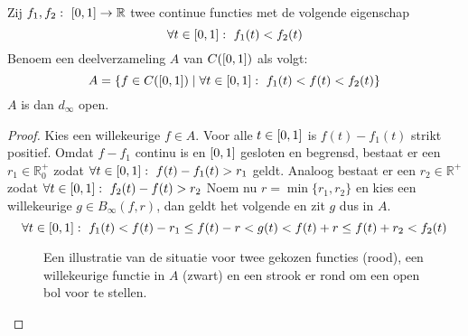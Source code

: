 \documentclass[main.tex]{subfiles}
\begin{document}
\begin{vb}
  Zij $f_{1},f_{2}:\ \interval{0}{1} \rightarrow \mathbb{R}$ twee continue functies met de volgende eigenschap
  \[ \forall t\in \interval{0}{1}:\ f_{1}(t) < f_{2}(t) \]
  Benoem een deelverzameling $A$ van $C(\interval{0}{1})$ als volgt:
  \[ A = \{ f\in C(\interval{0}{1}) \mid \forall t\in \interval{0}{1}:\ f_{1}(t) < f(t) < f_{2}(t) \} \]
  $A$ is dan $d_{\infty}$ open.

  \begin{proof}
    Kies een willekeurige $f\in A$.
    Voor alle $t\in \interval{0}{1}$ is $f(t) - f_{1}(t)$ strikt positief.
    Omdat $f-f_{1}$ continu is en $\interval{0}{1}$ gesloten en begrensd, bestaat er een $r_{1}\in\mathbb{R}_{0}^{+}$ zodat $\forall t\in \interval{0}{1}:\ f(t)-f_{1}(t) > r_{1}$ geldt.
    Analoog bestaat er een $r_{2}\in \mathbb{R}^{+}$ zodat $\forall t\in \interval{0}{1}:\ f_{2}(t) -f(t) > r_{2}$
    Noem nu $r=\min\{r_{1},r_{2}\}$ en kies een willekeurige $g\in B_{\infty}(f,r)$, dan geldt het volgende en zit $g$ dus in $A$.
    \[ \forall t\in \interval{0}{1}:\ f_{1}(t) < f(t) - r_{1} \le f(t) - r < g(t) < f(t) + r \le f(t) + r_{2} < f_{2}(t) \]

    \begin{figure}[H]
      \centering
      \caption{ Een illustratie van de situatie voor twee gekozen functies (rood), een willekeurige functie in $A$ (zwart) en een strook er rond om een open bol voor te stellen.}
    \end{figure}
  \end{proof}
\end{vb}
\end{document}

